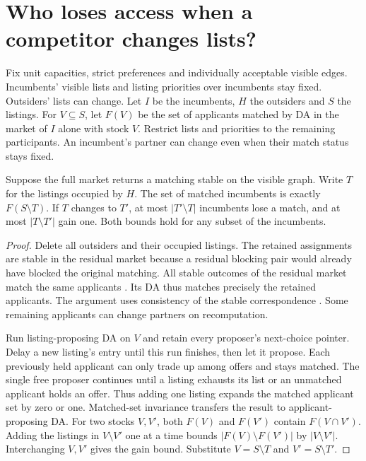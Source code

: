 \section{Who loses access when a competitor changes lists?}
Fix unit capacities, strict preferences and individually acceptable visible edges. Incumbents' visible lists and listing priorities over incumbents stay fixed. Outsiders' lists can change. Let $I$ be the incumbents, $H$ the outsiders and $S$ the listings. For $V\subseteq S$, let $F(V)$ be the set of applicants matched by DA in the market of $I$ alone with stock $V$. Restrict lists and priorities to the remaining participants. An incumbent's partner can change even when their match status stays fixed.

\begin{theorem}\label{thm:occupied-seats}
Suppose the full market returns a matching stable on the visible graph. Write $T$ for the listings occupied by $H$. The set of matched incumbents is exactly $F(S\setminus T)$. If $T$ changes to $T'$, at most $|T'\setminus T|$ incumbents lose a match, and at most $|T\setminus T'|$ gain one. Both bounds hold for any subset of the incumbents.
\end{theorem}
\begin{proof}
Delete all outsiders and their occupied listings. The retained assignments are stable in the residual market because a residual blocking pair would already have blocked the original matching. All stable outcomes of the residual market match the same applicants \cite{galesotomayor1985,roth1986}. Its DA thus matches precisely the retained applicants. The argument uses consistency of the stable correspondence \cite{sasaki1992}. Some remaining applicants can change partners on recomputation.

Run listing-proposing DA on $V$ and retain every proposer's next-choice pointer. Delay a new listing's entry until this run finishes, then let it propose. Each previously held applicant can only trade up among offers and stays matched. The single free proposer continues until a listing exhausts its list or an unmatched applicant holds an offer. Thus adding one listing expands the matched applicant set by zero or one. Matched-set invariance transfers the result to applicant-proposing DA. For two stocks $V,V'$, both $F(V)$ and $F(V')$ contain $F(V\cap V')$. Adding the listings in $V\setminus V'$ one at a time bounds $|F(V)\setminus F(V')|$ by $|V\setminus V'|$. Interchanging $V,V'$ gives the gain bound. Substitute $V=S\setminus T$ and $V'=S\setminus T'$.
\end{proof}

